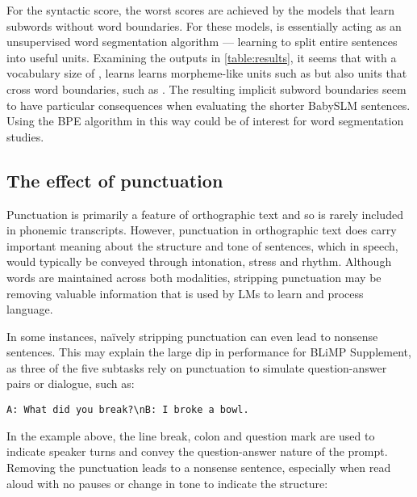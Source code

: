 

For the syntactic score, the worst scores are achieved by the models that learn subwords without word boundaries. For these models, \bpe is essentially acting as an unsupervised word segmentation algorithm --- learning to split entire sentences into useful units. Examining the outputs in \cref{table:results}, it seems that with a vocabulary size of , \bpe learns learns morpheme-like units such as  but also units that cross word boundaries, such as . The resulting implicit subword boundaries seem to have particular consequences when evaluating the shorter BabySLM sentences. Using the BPE algorithm in this way could be of interest for word segmentation studies. 

\subsection{The effect of punctuation}
\label{sec:14-punctuation}

Punctuation is primarily a feature of orthographic text and so is rarely included in phonemic transcripts. However, punctuation in orthographic text does carry important meaning about the structure and tone of sentences, which in speech, would typically be conveyed through intonation, stress and rhythm. Although words are maintained across both modalities, stripping punctuation may be removing valuable information that is used by LMs to learn and process language. 

In some instances, na\"ively stripping punctuation can even lead to nonsense sentences. This may explain the large dip in performance for BLiMP Supplement, as three of the five subtasks rely on punctuation to simulate question-answer pairs or dialogue, such as:

\begin{center}
\texttt{A: What did you break?\textbackslash nB: I broke a bowl.}
\end{center}

In the example above, the line break, colon and question mark are used to indicate speaker turns and convey the question-answer nature of the prompt. Removing the punctuation leads to a nonsense sentence, especially when read aloud with no pauses or change in tone to indicate the structure:

